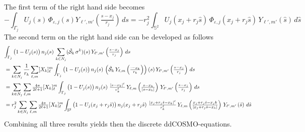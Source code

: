 The first term of the right hand side becomes
\[
	-\int_{\Gamma_j}  U_j(s) \, \Phi_{\varepsilon,j}(s) Y_{\ell',m'}\left(\tfrac{s-x_j}{r_j}\right) \, ds
	= -r_j^2\int_{\mathbb S^2}  U_j(x_j + r_j\hat s) \, \Phi_{\varepsilon,j}(x_j + r_j\hat s) \, Y_{\ell',m'}\left(\hat s\right) \, d\hat s
\]
The second term on the right hand side can be developed as follows
\begin{align*}
	\lefteqn{\int_{\Gamma_j} \big (1 - U_j(s)\big ) \, n_j(s) \, \sum_{k \in N_j} (\tilde{\mathcal{S}}_k \,  \sigma^k) (s)  \, Y_{\ell',m'}\left(\tfrac{s-x_j}{r_j}\right) \, ds}
	\\
	&= \sum_{k \in N_j}\frac{1}{r_k}\sum_{\ell,m} [X_k]_\ell^m \int_{\Gamma_j} \big (1 - U_j(s)\big ) \, n_j(s) \,   \left(\tilde{\mathcal{S}}_k \,  Y_{\ell,m}\left(\tfrac{\cdot-x_k}{r_k}\right)\right) (s)  \, Y_{\ell',m'}\left(\tfrac{s-x_j}{r_j}\right) \, ds
	\\
	&= \sum_{k \in N_j}\sum_{\ell,m} \tfrac{4 \pi }{2\ell+1}[X_k]_\ell^m \int_{\Gamma_j} \big (1 - U_j(s)\big ) \, n_j(s) \,    \, \tfrac{|s-x_k|^\ell}{r_k^\ell} \, Y_{\ell,m} \left(\tfrac{s-x_k}{|s-x_k|}\right)  \, Y_{\ell',m'}\left(\tfrac{s-x_j}{r_j}\right) \, ds
	\\
	&= r_j^2 \sum_{k \in N_j}\sum_{\ell,m} \tfrac{4 \pi }{2\ell+1}[X_k]_\ell^m \int_{\mathbb S^2} \big (1 - U_j(x_j + r_j\hat s)\big ) \, n_j(x_j + r_j\hat s) \,    \, \tfrac{|x_j + r_j\hat s-x_k|^\ell}{r_k^\ell} \, Y_{\ell,m} \left(\tfrac{x_j + r_j\hat s-x_jk}{|x_j + r_j\hat s-x_k|}\right)  \, Y_{\ell',m'}\left(\hat s\right) \, d\hat s
\end{align*}
Combining all three results yields then the discrete ddCOSMO-equations.
